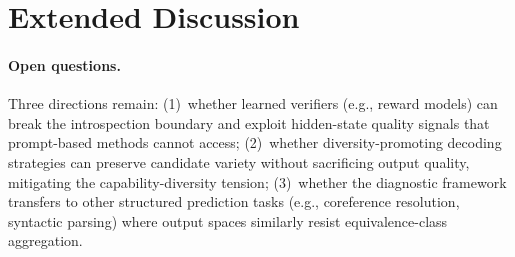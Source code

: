 \begin{table}[h]
\centering
\small
\caption{Differentiation matrix: positioning relative to prior work on self-consistency limitations. ``Methods tested'' counts the number of distinct aggregation/selection categories evaluated (not hyperparameter variants).}
\label{tab:differentiation}
\end{table}

\section{Extended Discussion}\label{app:objections}

\paragraph{Open questions.}
Three directions remain: (1)~whether learned verifiers (e.g., reward models) can break the introspection boundary and exploit hidden-state quality signals that prompt-based methods cannot access; (2)~whether diversity-promoting decoding strategies can preserve candidate variety without sacrificing output quality, mitigating the capability-diversity tension; (3)~whether the diagnostic framework transfers to other structured prediction tasks (e.g., coreference resolution, syntactic parsing) where output spaces similarly resist equivalence-class aggregation.

